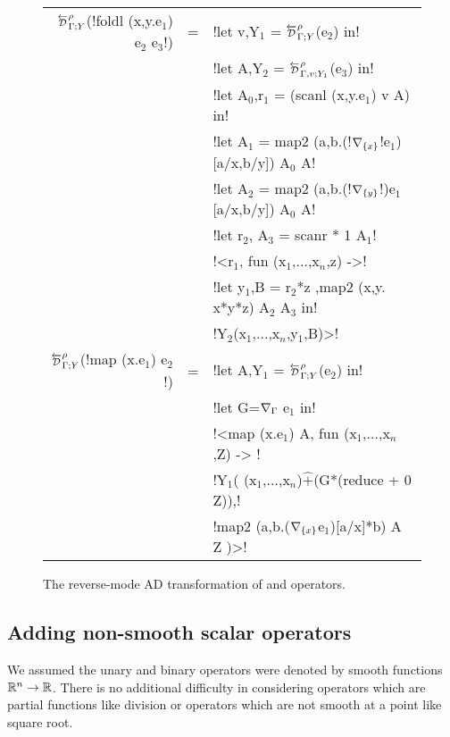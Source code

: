 \begin{figure}
\begin{center}
\begin{tabular}{|r c l|}
\hline
    $\directD{\rho}{\Gamma}{Y}$(!foldl (x,y.e$_1$) e$_2$ e$_3$!) &=&
            !let v,Y$_1$ = $\directD{\rho}{\Gamma}{Y}$(e$_2$) in! \\
            && !let A,Y$_2$ = $\directD{\rho}{\Gamma,v}{Y_1}$(e$_3$) in! \\
            && !let A$_0$,r$_1$ = (scanl (x,y.e$_1$) v A) in! \\
            && !let A$_1$ = map2 (a,b.(!$\nabla_{\{x\}}$!e$_1$)[a/x,b/y]) A$_0$ A! \\
            && !let A$_2$ = map2 (a,b.(!$\nabla_{\{y\}}$!)e$_1$[a/x,b/y]) A$_0$ A! \\
            && !let r$_2$, A$_3$ = scanr * 1 A$_1$! \\
            && !<r$_1$, fun (x$_1$,$\ldots$,x$_n$,z) ->! \\
            && !let y$_1$,B = r$_2$*z ,map2 (x,y. x*y*z) A$_2$ A$_3$ in! \\
            && !Y$_2$(x$_1$,$\ldots$,x$_n$,y$_1$,B)>! \\
    $\directD{\rho}{\Gamma}{Y}$(!map (x.e$_{1}$) e$_{2}$!) &=&  
            !let A,Y$_{1}$ = $\directD{\rho}{\Gamma}{Y}$(e$_{2}$) in! \\
            && !let G=$\nabla_{\Gamma}$ e$_{1}$ in!\\
            && !<map (x.e$_{1}$) A, fun (x$_{1}$,$\ldots$,x$_n$,Z) -> !\\
            && !Y$_{1}$( (x$_{1}$,$\ldots$,x$_n$)$\widehat{+}$(G*(reduce + 0 Z)),!\\
            && \quad\quad !map2 (a,b.($\nabla_{\{x\}}$e$_{1}$)[a/x]*b) A Z )>!\\\hline
\end{tabular}
\end{center}
\caption{The reverse-mode AD transformation of  and  operators.}
\label{fig:foldl_map_trans}
\end{figure}

\subsection{Adding non-smooth scalar operators} %
\label{sub:lift_non_smooth}

We assumed the unary and binary operators were denoted by smooth functions $\mathbb{R}^n\to\mathbb{R}$. 
There is no additional difficulty in considering operators which are partial functions 
like division or operators which are not smooth at a point like square root.

